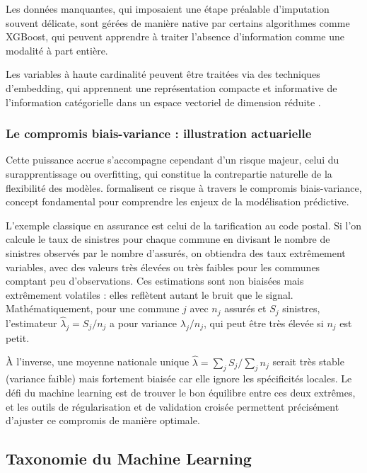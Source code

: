 \documentclass[
  french,
]{book}
\theoremstyle{definition}
\theoremstyle{definition}
\theoremstyle{definition}
\theoremstyle{definition}
\theoremstyle{remark}
\begin{document}
Les données manquantes, qui imposaient une étape préalable d'imputation souvent délicate, sont gérées de manière native par certains algorithmes comme XGBoost, qui peuvent apprendre à traiter l'absence d'information comme une modalité à part entière.

Les variables à haute cardinalité peuvent être traitées via des techniques d'embedding, qui apprennent une représentation compacte et informative de l'information catégorielle dans un espace vectoriel de dimension réduite \citet{avanzi2024machine}.

\subsubsection{Le compromis biais-variance : illustration actuarielle}

Cette puissance accrue s'accompagne cependant d'un risque majeur, celui du surapprentissage ou overfitting, qui constitue la contrepartie naturelle de la flexibilité des modèles. \citet{hastie2009elements} formalisent ce risque à travers le compromis biais-variance, concept fondamental pour comprendre les enjeux de la modélisation prédictive.

L'exemple classique en assurance est celui de la tarification au code postal. Si l'on calcule le taux de sinistres pour chaque commune en divisant le nombre de sinistres observés par le nombre d'assurés, on obtiendra des taux extrêmement variables, avec des valeurs très élevées ou très faibles pour les communes comptant peu d'observations. Ces estimations sont non biaisées mais extrêmement volatiles : elles reflètent autant le bruit que le signal. Mathématiquement, pour une commune \(j\) avec \(n_j\) assurés et \(S_j\) sinistres, l'estimateur \(\hat{\lambda}_j = S_j/n_j\) a pour variance \(\lambda_j/n_j\), qui peut être très élevée si \(n_j\) est petit.

À l'inverse, une moyenne nationale unique \(\hat{\lambda} = \sum_j S_j / \sum_j n_j\) serait très stable (variance faible) mais fortement biaisée car elle ignore les spécificités locales. Le défi du machine learning est de trouver le bon équilibre entre ces deux extrêmes, et les outils de régularisation et de validation croisée permettent précisément d'ajuster ce compromis de manière optimale.

\subsection{Taxonomie du Machine Learning}
\end{document}
